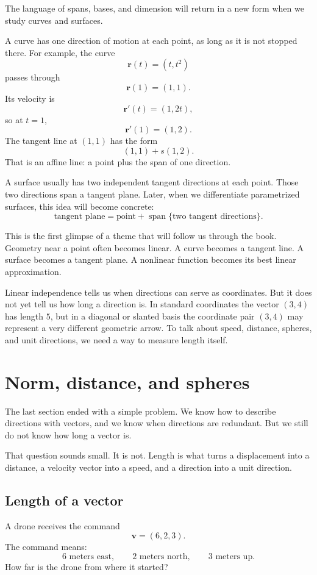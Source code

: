 The language of spans, bases, and dimension will return in a new form when we study
curves and surfaces.

A curve has one direction of motion at each point, as long as it is not stopped there.
For example, the curve
\[
    \mathbf r(t)=(t,t^2)
\]
passes through
\[
    \mathbf r(1)=(1,1).
\]
Its velocity is
\[
    \mathbf r'(t)=(1,2t),
\]
so at \(t=1\),
\[
    \mathbf r'(1)=(1,2).
\]
The tangent line at \((1,1)\) has the form
\[
    (1,1)+s(1,2).
\]
That is an affine line: a point plus the span of one direction.

A surface usually has two independent tangent directions at each point.  Those two
directions span a tangent plane.  Later, when we differentiate parametrized surfaces,
this idea will become concrete:
\[
    \text{tangent plane}=\text{point}+\operatorname{span}\{\text{two tangent directions}\}.
\]

This is the first glimpse of a theme that will follow us through the book.  Geometry
near a point often becomes linear.  A curve becomes a tangent line.  A surface becomes
a tangent plane.  A nonlinear function becomes its best linear approximation.

Linear independence tells us when directions can serve as coordinates.  But it does
not yet tell us how long a direction is.  In standard coordinates the vector \((3,4)\)
has length \(5\), but in a diagonal or slanted basis the coordinate pair \((3,4)\) may
represent a very different geometric arrow.  To talk about speed, distance, spheres, and
unit directions, we need a way to measure length itself.
\section{Norm, distance, and spheres}

The last section ended with a simple problem.  We know how to describe directions with
vectors, and we know when directions are redundant.  But we still do not know how long
a vector is.

That question sounds small.  It is not.  Length is what turns a displacement into a
distance, a velocity vector into a speed, and a direction into a unit direction.

\subsection{Length of a vector}

A drone receives the command
\[
    \mathbf v=(6,2,3).
\]
The command means:
\[
    6 \text{ meters east},\qquad 2 \text{ meters north},\qquad 3 \text{ meters up}.
\]
How far is the drone from where it started?

